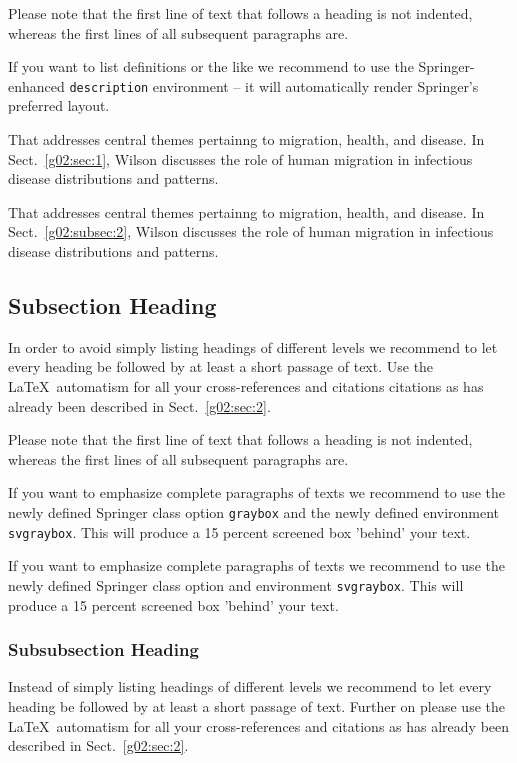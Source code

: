 \documentclass[graybox]{svmult}
\begin{document}
Please note that the first line of text that follows a heading is not indented, whereas the first lines of all subsequent paragraphs are.

If you want to list definitions or the like we recommend to use the Springer-enhanced \verb|description| environment -- it will automatically render Springer's preferred layout.

\begin{description}[Type 1]
\item[Type 1]{That addresses central themes pertainng to migration, health, and disease. In Sect.~\ref{g02:sec:1}, Wilson discusses the role of human migration in infectious disease distributions and patterns.}
\item[Type 2]{That addresses central themes pertainng to migration, health, and disease. In Sect.~\ref{g02:subsec:2}, Wilson discusses the role of human migration in infectious disease distributions and patterns.}
\end{description}

\subsection{Subsection Heading} %
In order to avoid simply listing headings of different levels we recommend to let every heading be followed by at least a short passage of text. Use the \LaTeX\ automatism for all your cross-references and citations citations as has already been described in Sect.~\ref{g02:sec:2}.

Please note that the first line of text that follows a heading is not indented, whereas the first lines of all subsequent paragraphs are.

\begin{svgraybox}
If you want to emphasize complete paragraphs of texts we recommend to use the newly defined Springer class option \verb|graybox| and the newly defined environment \verb|svgraybox|. This will produce a 15 percent screened box 'behind' your text.

If you want to emphasize complete paragraphs of texts we recommend to use the newly defined Springer class option and environment \verb|svgraybox|. This will produce a 15 percent screened box 'behind' your text.
\end{svgraybox}


\subsubsection{Subsubsection Heading}
Instead of simply listing headings of different levels we recommend to let every heading be followed by at least a short passage of text. Further on please use the \LaTeX\ automatism for all your cross-references and citations as has already been described in Sect.~\ref{g02:sec:2}.
\end{document}
